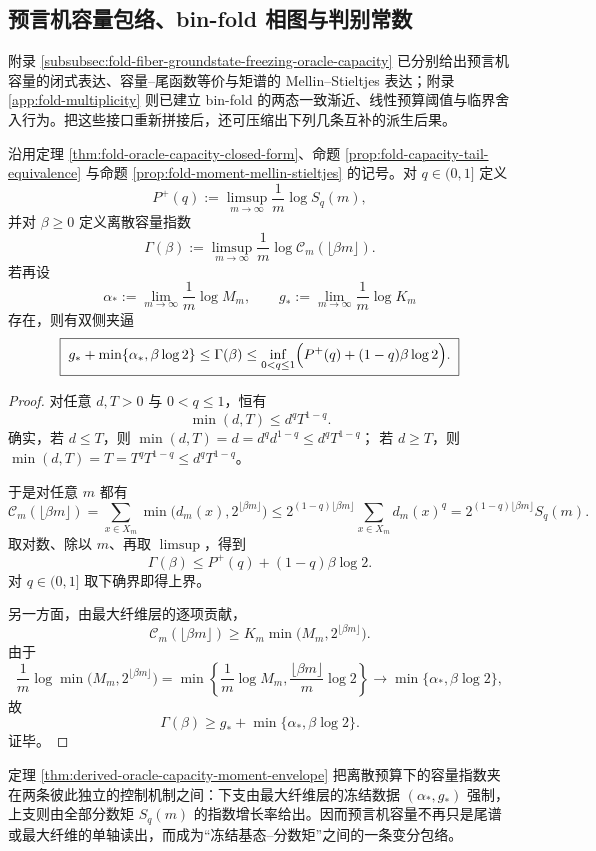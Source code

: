 \subsection{预言机容量包络、bin-fold 相图与判别常数}

附录 \ref{subsubsec:fold-fiber-groundstate-freezing-oracle-capacity} 已分别给出预言机容量的闭式表达、容量--尾函数等价与矩谱的 Mellin--Stieltjes 表达；附录 \ref{app:fold-multiplicity} 则已建立 bin-fold 的两态一致渐近、线性预算阈值与临界舍入行为。把这些接口重新拼接后，还可压缩出下列几条互补的派生后果。

\begin{theorem}[预言机容量指数的矩谱上包络与冻结下支]\label{thm:derived-oracle-capacity-moment-envelope}
沿用定理 \ref{thm:fold-oracle-capacity-closed-form}、命题 \ref{prop:fold-capacity-tail-equivalence} 与命题 \ref{prop:fold-moment-mellin-stieltjes} 的记号。对 \(q\in(0,1]\) 定义
\[
P^{+}(q):=\limsup_{m\to\infty}\frac1m\log S_q(m),
\]
并对 \(\beta\ge 0\) 定义离散容量指数
\[
\Gamma(\beta):=\limsup_{m\to\infty}\frac1m\log \mathcal C_m(\lfloor \beta m\rfloor).
\]
若再设
\[
\alpha_*:=\lim_{m\to\infty}\frac1m\log M_m,
\qquad
g_*:=\lim_{m\to\infty}\frac1m\log K_m
\]
存在，则有双侧夹逼
\[
\boxed{\;
g_*+\min\{\alpha_*,\beta\log 2\}
\le
\Gamma(\beta)
\le
\inf_{0<q\le 1}\Bigl(P^{+}(q)+(1-q)\beta\log 2\Bigr).\;}
\]
\end{theorem}
\begin{proof}
对任意 \(d,T>0\) 与 \(0<q\le 1\)，恒有
\[
\min(d,T)\le d^qT^{1-q}.
\]
确实，若 \(d\le T\)，则
\(
\min(d,T)=d=d^qd^{1-q}\le d^qT^{1-q}
\)；
若 \(d\ge T\)，则
\(
\min(d,T)=T=T^qT^{1-q}\le d^qT^{1-q}
\)。

于是对任意 \(m\) 都有
\[
\mathcal C_m(\lfloor \beta m\rfloor)
=
\sum_{x\in X_m}\min\bigl(d_m(x),2^{\lfloor \beta m\rfloor}\bigr)
\le
2^{(1-q)\lfloor \beta m\rfloor}\sum_{x\in X_m}d_m(x)^q
=
2^{(1-q)\lfloor \beta m\rfloor}S_q(m).
\]
取对数、除以 \(m\)、再取 \(\limsup\)，得到
\[
\Gamma(\beta)\le P^{+}(q)+(1-q)\beta\log 2.
\]
对 \(q\in(0,1]\) 取下确界即得上界。

另一方面，由最大纤维层的逐项贡献，
\[
\mathcal C_m(\lfloor \beta m\rfloor)\ge K_m\min\bigl(M_m,2^{\lfloor \beta m\rfloor}\bigr).
\]
由于
\[
\frac1m\log \min\bigl(M_m,2^{\lfloor \beta m\rfloor}\bigr)
=
\min\!\left\{\frac1m\log M_m,\frac{\lfloor \beta m\rfloor}{m}\log 2\right\}
\longrightarrow
\min\{\alpha_*,\beta\log 2\},
\]
故
\[
\Gamma(\beta)\ge g_*+\min\{\alpha_*,\beta\log 2\}.
\]
证毕。
\end{proof}

\begin{remark}[冻结基态与分数矩的双包络]\label{rem:derived-oracle-capacity-moment-envelope}
定理 \ref{thm:derived-oracle-capacity-moment-envelope} 把离散预算下的容量指数夹在两条彼此独立的控制机制之间：下支由最大纤维层的冻结数据 \((\alpha_*,g_*)\) 强制，上支则由全部分数矩 \(S_q(m)\) 的指数增长率给出。因而预言机容量不再只是尾谱或最大纤维的单轴读出，而成为“冻结基态--分数矩”之间的一条变分包络。
\end{remark}


